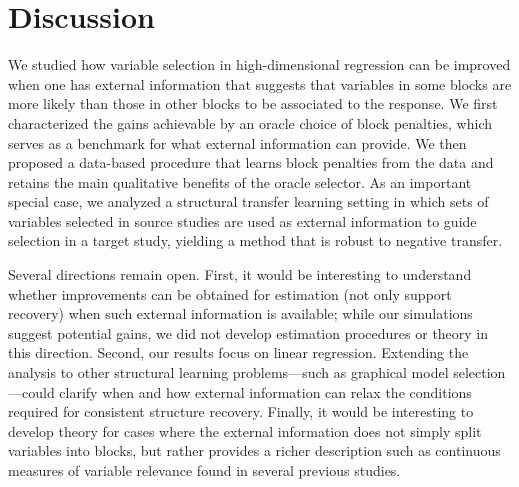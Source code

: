 \documentclass[
  12pt]{article}
\begin{document}
\section{Discussion}
We studied how 
variable selection in high-dimensional regression can be improved when one has external information that suggests that variables in some blocks are more likely than those in other blocks to be associated to the response. 
We first characterized the gains achievable by an oracle choice of block penalties, which serves as a benchmark for what external information can provide. 
We then proposed a data-based procedure that learns block penalties from the data and retains the main qualitative benefits of the oracle selector. 
As an important special case, we analyzed a structural transfer learning setting in which sets of variables selected in source studies are used as external information to guide selection in a target study, yielding a method that is robust to negative transfer.

Several directions remain open. 
First, it would be interesting to understand whether improvements can be obtained for estimation (not only support recovery) when such external information is available; while our simulations suggest potential gains, we did not develop estimation procedures or theory in this direction. 
Second, our results focus on linear regression. Extending the analysis to other structural learning problems—such as graphical model selection—could clarify when and how external information can relax the conditions required for consistent structure recovery.
Finally, it would be interesting to develop theory for cases where the external information does not simply split variables into blocks, but rather provides a richer description such as continuous measures of variable relevance found in several previous studies. 


\end{document}
